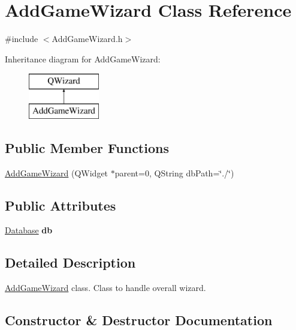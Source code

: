 \hypertarget{class_add_game_wizard}{}\section{Add\+Game\+Wizard Class Reference}
\label{class_add_game_wizard}


{\ttfamily \#include $<$Add\+Game\+Wizard.\+h$>$}

Inheritance diagram for Add\+Game\+Wizard\+:\begin{figure}[H]
\begin{center}
\leavevmode
\includegraphics[height=2.000000cm]{class_add_game_wizard}
\end{center}
\end{figure}
\subsection*{Public Member Functions}
\begin{DoxyCompactItemize}
\item 
\hyperlink{class_add_game_wizard_ac2399aa54675e746f88c354e970ec479}{Add\+Game\+Wizard} (Q\+Widget $\ast$parent=0, Q\+String db\+Path=\char`\"{}./\char`\"{})
\end{DoxyCompactItemize}
\subsection*{Public Attributes}
\begin{DoxyCompactItemize}
\item 
\hypertarget{class_add_game_wizard_a126019074d1a4276876f380151ac7d9a}{}\hyperlink{class_database}{Database} {\bfseries db}\label{class_add_game_wizard_a126019074d1a4276876f380151ac7d9a}

\end{DoxyCompactItemize}


\subsection{Detailed Description}
\hyperlink{class_add_game_wizard}{Add\+Game\+Wizard} class. Class to handle overall wizard. 

\subsection{Constructor \& Destructor Documentation}
\hypertarget{class_add_game_wizard_ac2399aa54675e746f88c354e970ec479}{}

